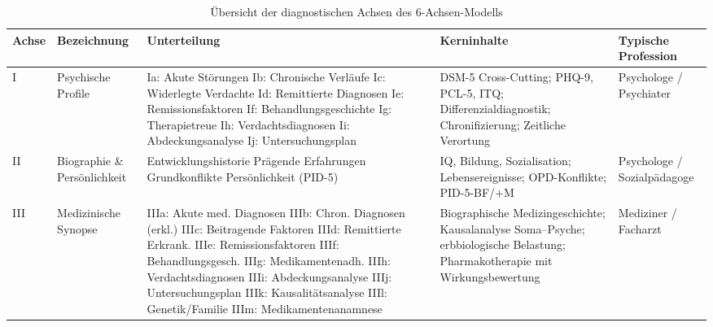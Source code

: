 \documentclass[11pt,a4paper]{article}
\begin{document}
\begin{table}[H]
\centering
\caption{\"Ubersicht der diagnostischen Achsen des 6-Achsen-Modells}
\label{tab:achsen}
\scriptsize
\begin{tabularx}{\textwidth}{@{}L{0.8cm}L{2.1cm}L{3.3cm}Y L{2.2cm}@{}}
\toprule
\textbf{Achse} & \textbf{Bezeichnung} & \textbf{Unterteilung} & \textbf{Kerninhalte} & \textbf{Typische Profession} \\
\midrule
I & Psychische Profile & Ia: Akute St\"orungen \newline Ib: Chronische Verl\"aufe \newline Ic: Widerlegte Verdachte \newline Id: Remittierte Diagnosen \newline Ie: Remissionsfaktoren \newline If: Behandlungsgeschichte \newline Ig: Therapietreue \newline Ih: Verdachtsdiagnosen \newline Ii: Abdeckungsanalyse \newline Ij: Untersuchungsplan & DSM-5 Cross-Cutting; PHQ-9, PCL-5, ITQ; Differenzialdiagnostik; Chronifizierung; Zeitliche Verortung & Psychologe / Psychiater \\
\addlinespace
II & Biographie \& Pers\"onlichkeit & Entwicklungshistorie \newline Pr\"agende Erfahrungen \newline Grundkonflikte \newline Pers\"onlichkeit (PID-5) & IQ, Bildung, Sozialisation; Lebensereignisse; OPD-Konflikte; PID-5-BF/+M & Psychologe / Sozialp\"adagoge \\
\addlinespace
III & Medizinische Synopse & IIIa: Akute med. Diagnosen \newline IIIb: Chron. Diagnosen (erkl.) \newline IIIc: Beitragende Faktoren \newline IIId: Remittierte Erkrank. \newline IIIe: Remissionsfaktoren \newline IIIf: Behandlungsgesch. \newline IIIg: Medikamentenadh. \newline IIIh: Verdachtsdiagnosen \newline IIIi: Abdeckungsanalyse \newline IIIj: Untersuchungsplan \newline IIIk: Kausalit\"atsanalyse \newline IIIl: Genetik/Familie \newline IIIm: Medikamenten\-anamnese & Biographische Medizin\-geschichte; Kausal\-analyse Soma--Psyche; erbbiologische Belastung; Pharmako\-therapie mit Wirkungs\-bewertung & Mediziner / Facharzt \\

\end{tabularx}
\end{table}
\end{document}

